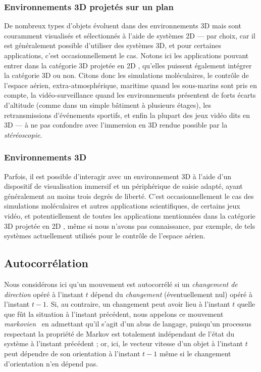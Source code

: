 	\FloatBarrier \subsubsection{Environnements 3D projetés sur un plan}
	De nombreux types d'objets évoluent dans des environnements 3D mais sont couramment visualisés et sélectionnés à l'aide de systèmes 2D --- par choix, car il est généralement possible d'utiliser des systèmes 3D, et pour certaines applications, c'est occasionnellement le cas. Notons ici les applications pouvant entrer dans la catégorie \og 3D projetée en 2D \fg{}, qu'elles puissent également intégrer la catégorie 3D ou non. Citons donc les simulations moléculaires, le contrôle de l'espace aérien, extra-atmosphérique, maritime quand les sous-marins sont pris en compte, la vidéo-surveillance quand les environnements présentent de forts écarts d'altitude (comme dans un simple bâtiment à plusieurs étages), les retransmissions d'événements sportifs, et enfin la plupart des jeux vidéo dits \og en 3D \fg{} --- à ne pas confondre avec l'immersion en 3D rendue possible par la \emph{stéréoscopie}.
	
	\FloatBarrier \subsubsection{Environnements 3D}
	Parfois, il est possible d'interagir avec un environnement 3D à l'aide d'un dispositif de visualisation immersif et un périphérique de saisie adapté, ayant généralement au moins trois degrés de liberté. C'est occasionnellement le cas des simulations moléculaires et autres applications scientifiques, de certains jeux vidéo, et potentiellement de toutes les applications mentionnées dans la catégorie \og 3D projetée en 2D \fg{}, même si nous n'avons pas connaissance, par exemple, de tels systèmes actuellement utilisés pour le contrôle de l'espace aérien.

	\FloatBarrier \subsection{Autocorrélation}
	Nous considérons ici qu'un mouvement est autocorrélé si un \emph{changement de direction} opéré à l'instant $t$ dépend du \emph{changement} (éventuellement nul) opéré à l'instant $t-1$. Si, au contraire, un changement peut avoir lieu à l'instant $t$ quelle que fût la situation à l'instant précédent, nous appelons ce mouvement \emph{markovien}~\cite{markov1960theory} en admettant qu'il s'agit d'un abus de langage, puisqu'un processus respectant la propriété de Markov est totalement indépendant de l'état du système à l'instant précédent ; or, ici, le vecteur vitesse d'un objet à l'instant $t$ peut dépendre de son orientation à l'instant $t-1$ même si le changement d'orientation n'en dépend pas.
	

